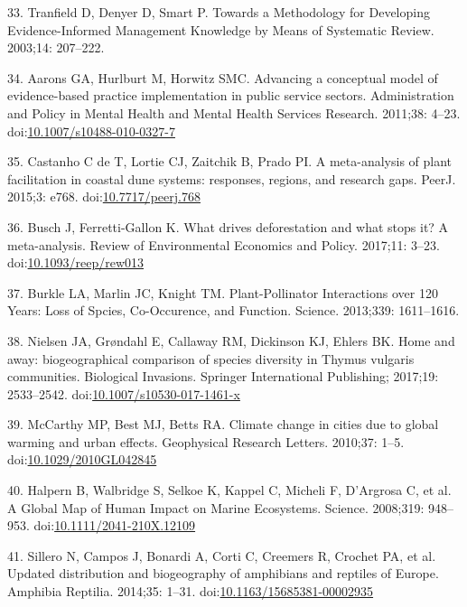 \documentclass[10pt,letterpaper]{article}
\begin{document}
\hypertarget{ref-Tranfield2003}{}
33. Tranfield D, Denyer D, Smart P. Towards a Methodology for Developing
Evidence-Informed Management Knowledge by Means of Systematic Review.
2003;14: 207--222.

\hypertarget{ref-Aarons2011}{}
34. Aarons GA, Hurlburt M, Horwitz SMC. Advancing a conceptual model of
evidence-based practice implementation in public service sectors.
Administration and Policy in Mental Health and Mental Health Services
Research. 2011;38: 4--23.
doi:\href{https://doi.org/10.1007/s10488-010-0327-7}{10.1007/s10488-010-0327-7}

\hypertarget{ref-Castanho2015}{}
35. Castanho C de T, Lortie CJ, Zaitchik B, Prado PI. A meta-analysis of
plant facilitation in coastal dune systems: responses, regions, and
research gaps. PeerJ. 2015;3: e768.
doi:\href{https://doi.org/10.7717/peerj.768}{10.7717/peerj.768}

\hypertarget{ref-Busch2017}{}
36. Busch J, Ferretti-Gallon K. What drives deforestation and what stops
it? A meta-analysis. Review of Environmental Economics and Policy.
2017;11: 3--23.
doi:\href{https://doi.org/10.1093/reep/rew013}{10.1093/reep/rew013}

\hypertarget{ref-Burkle2013}{}
37. Burkle LA, Marlin JC, Knight TM. Plant-Pollinator Interactions over
120 Years: Loss of Spcies, Co-Occurence, and Function. Science.
2013;339: 1611--1616.

\hypertarget{ref-Nielsen2017}{}
38. Nielsen JA, Grøndahl E, Callaway RM, Dickinson KJ, Ehlers BK. Home
and away: biogeographical comparison of species diversity in Thymus
vulgaris communities. Biological Invasions. Springer International
Publishing; 2017;19: 2533--2542.
doi:\href{https://doi.org/10.1007/s10530-017-1461-x}{10.1007/s10530-017-1461-x}

\hypertarget{ref-McCarthy2010}{}
39. McCarthy MP, Best MJ, Betts RA. Climate change in cities due to
global warming and urban effects. Geophysical Research Letters. 2010;37:
1--5.
doi:\href{https://doi.org/10.1029/2010GL042845}{10.1029/2010GL042845}

\hypertarget{ref-Halpern2008}{}
40. Halpern B, Walbridge S, Selkoe K, Kappel C, Micheli F, D'Argrosa C,
et al. A Global Map of Human Impact on Marine Ecosystems. Science.
2008;319: 948--953.
doi:\href{https://doi.org/10.1111/2041-210X.12109}{10.1111/2041-210X.12109}

\hypertarget{ref-Sillero2014}{}
41. Sillero N, Campos J, Bonardi A, Corti C, Creemers R, Crochet PA, et
al. Updated distribution and biogeography of amphibians and reptiles of
Europe. Amphibia Reptilia. 2014;35: 1--31.
doi:\href{https://doi.org/10.1163/15685381-00002935}{10.1163/15685381-00002935}
\end{document}
